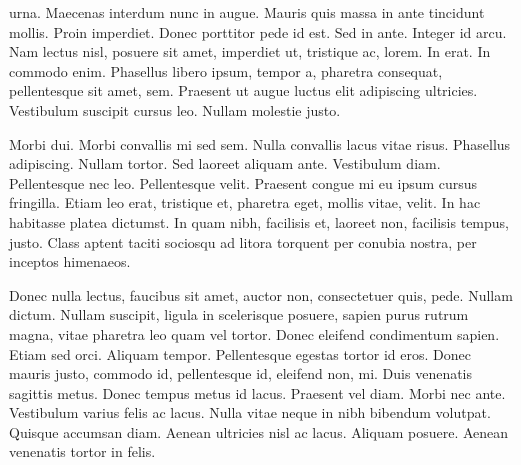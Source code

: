 \documentclass[a4paper]{article}
\begin{document}
\listoftodos

%
urna. Maecenas interdum nunc in augue. Mauris quis massa in ante
tincidunt mollis. Proin imperdiet. Donec porttitor pede id est. Sed
in ante. Integer id arcu. Nam lectus nisl, posuere sit amet,
imperdiet ut, tristique ac, lorem. In erat. In commodo enim.
%
Phasellus libero ipsum, tempor a, pharetra consequat, pellentesque
sit amet, sem. Praesent ut augue luctus elit adipiscing ultricies.
Vestibulum suscipit cursus leo. Nullam molestie justo.

Morbi dui. Morbi convallis mi sed sem. Nulla convallis lacus vitae
risus. Phasellus adipiscing. Nullam tortor. Sed laoreet aliquam
ante. Vestibulum diam. Pellentesque nec leo. Pellentesque velit.
%
Praesent congue mi eu ipsum cursus fringilla. Etiam leo erat,
tristique et, pharetra eget, mollis vitae, velit. In hac habitasse
%
platea dictumst. In quam nibh, facilisis et, laoreet non, facilisis
tempus, justo. Class aptent taciti sociosqu ad litora torquent per
conubia nostra, per inceptos himenaeos.


Donec nulla lectus, faucibus sit amet, auctor non, consectetuer
quis, pede. Nullam dictum. Nullam suscipit, ligula in scelerisque
%
posuere, sapien purus rutrum magna, vitae pharetra leo quam vel
tortor. Donec eleifend condimentum sapien. Etiam sed orci. Aliquam
%
tempor. Pellentesque egestas tortor id eros. Donec mauris justo,
commodo id, pellentesque id, eleifend non, mi. Duis venenatis
sagittis metus. Donec tempus metus id lacus. Praesent vel diam.
Morbi nec ante. Vestibulum varius felis ac lacus. Nulla vitae neque
%
in nibh bibendum volutpat. Quisque accumsan diam. Aenean ultricies
nisl ac lacus. Aliquam posuere. Aenean venenatis tortor in felis.
\end{document}
